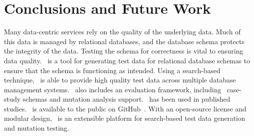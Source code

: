 \section{Conclusions and Future Work}\label{sec:conclusion}

Many data-centric services rely on the quality of the underlying data. Much of this data is managed by relational
databases, and the database schema protects the integrity of the data.  Testing the schema for correctness is vital to
ensuring data quality. \sa~is a tool for generating test data for relational database schemas to ensure that the schema
is functioning as intended. Using a search-based technique, \sa~is able to provide high quality test data across
multiple database management systems. \sa~also includes an evaluation framework, including
\numprovidedschemas~case-study schemas and mutation analysis support. \sa~has been used in \numuniquepapers published
studies.  \sa~is available to the public on GitHub~\cite{tool}. With an open-source license and modular design, \sa~is
an extensible platform for search-based test data generation and mutation testing.
